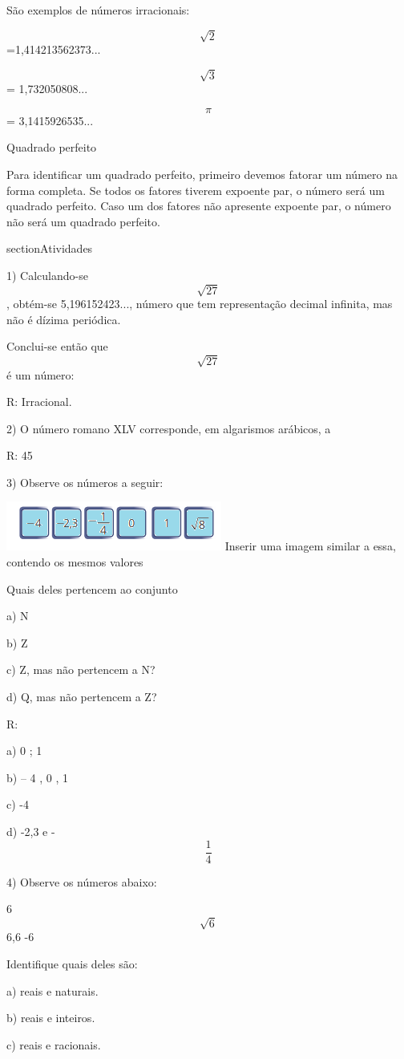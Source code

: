 São exemplos de números irracionais:

\[\sqrt{2}\]=1,414213562373...

\[\sqrt{3}\] = 1,732050808...

\[\pi\] = 3,1415926535...

Quadrado perfeito

Para identificar um quadrado perfeito, primeiro devemos fatorar um
número na forma completa. Se todos os fatores tiverem expoente par, o
número será um quadrado perfeito. Caso um dos fatores não apresente
expoente par, o número não será um quadrado perfeito.

section{Atividades}

1) Calculando-se \[\sqrt{27}\] , obtém-se 5,196152423..., número que tem
representação decimal infinita, mas não é dízima periódica.

Conclui-se então que \[\sqrt{27}\] é um número:

R: Irracional.

2) O número romano XLV corresponde, em algarismos arábicos, a

R: 45

3) Observe os números a seguir:

\includegraphics[width=2.79167in,height=0.63542in]{./imgSAEB_8_MAT/media/image1.png}
Inserir uma imagem similar a essa, contendo os mesmos valores

Quais deles pertencem ao conjunto

a) N

b) Z

c) Z, mas não pertencem a N?

d) Q, mas não pertencem a Z?

R:

a) 0 ; 1

b) -- 4 , 0 , 1

c) -4

d) -2,3 e - \[\frac{1}{4}\]

4) Observe os números abaixo:

6 \[\sqrt{6}\] 6,6 -6

Identifique quais deles são:

a) reais e naturais.

b) reais e inteiros.

c) reais e racionais.

